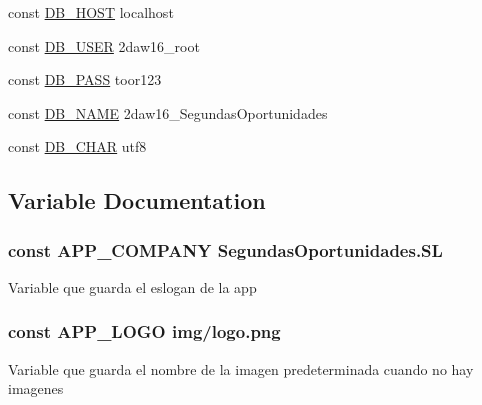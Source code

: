 \begin{DoxyCompactItemize}
\item 
const \hyperlink{_config_8php_a293363d7988627f671958e2d908c202a}{D\+B\+\_\+\+H\+O\+S\+T} \textquotesingle{}localhost\textquotesingle{}
\item 
const \hyperlink{_config_8php_a1d1d99f8e08f387d84fe9848f3357156}{D\+B\+\_\+\+U\+S\+E\+R} \textquotesingle{}2daw16\+\_\+root\textquotesingle{}
\item 
const \hyperlink{_config_8php_a8bb9c4546d91667cfa61879d83127a92}{D\+B\+\_\+\+P\+A\+S\+S} \textquotesingle{}toor123\textquotesingle{}
\item 
const \hyperlink{_config_8php_ab5db0d3504f917f268614c50b02c53e2}{D\+B\+\_\+\+N\+A\+M\+E} \textquotesingle{}2daw16\+\_\+\+Segundas\+Oportunidades\textquotesingle{}
\item 
const \hyperlink{_config_8php_ac39b082e3110f9c9d60da88c896ec24b}{D\+B\+\_\+\+C\+H\+A\+R} \textquotesingle{}utf8\textquotesingle{}
\end{DoxyCompactItemize}


\subsection{Variable Documentation}
\hypertarget{_config_8php_a3a9898264231492488c0204d4716e94d}{}
\subsubsection[{A\+P\+P\+\_\+\+C\+O\+M\+P\+A\+N\+Y}]{\setlength{\rightskip}{0pt plus 5cm}const A\+P\+P\+\_\+\+C\+O\+M\+P\+A\+N\+Y \textquotesingle{}Segundas\+Oportunidades.\+S\+L\textquotesingle{}}\label{_config_8php_a3a9898264231492488c0204d4716e94d}
Variable que guarda el eslogan de la app \hypertarget{_config_8php_a6258d495ac54e2ef923ec328f09693a6}{}
\subsubsection[{A\+P\+P\+\_\+\+L\+O\+G\+O}]{\setlength{\rightskip}{0pt plus 5cm}const A\+P\+P\+\_\+\+L\+O\+G\+O \textquotesingle{}img/logo.\+png\textquotesingle{}}\label{_config_8php_a6258d495ac54e2ef923ec328f09693a6}
Variable que guarda el nombre de la imagen predeterminada cuando no hay imagenes \hypertarget{_config_8php_aec1351293f88691205169becf08d525d}{}
